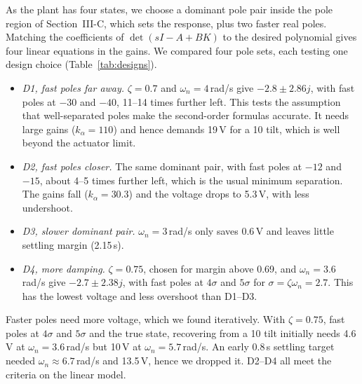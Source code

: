 As the plant has four states, we choose a dominant pole pair inside the pole region of Section~III-C, which sets the response, plus two faster real poles. Matching the coefficients of $\det(sI-A+BK)$ to the desired polynomial gives four linear equations in the gains. We compared four pole sets, each testing one design choice (Table~\ref{tab:designs}).
\begin{itemize}
\item \emph{D1, fast poles far away.} $\zeta=0.7$ and $\omega_n=4$\,rad/s give $-2.8\pm2.86j$, with fast poles at $-30$ and $-40$, 11--14 times further left. This tests the assumption that well-separated poles make the second-order formulas accurate. It needs large gains ($k_\alpha=110$) and hence demands 19\,V for a 10\textdegree{} tilt, which is well beyond the actuator limit.
\item \emph{D2, fast poles closer.} The same dominant pair, with fast poles at $-12$ and $-15$, about 4--5 times further left, which is the usual minimum separation. The gains fall ($k_\alpha=30.3$) and the voltage drops to 5.3\,V, with less undershoot.
\item \emph{D3, slower dominant pair.} $\omega_n=3$\,rad/s only saves 0.6\,V and leaves little settling margin (2.15\,s).
\item \emph{D4, more damping.} $\zeta=0.75$, chosen for margin above 0.69, and $\omega_n=3.6$\,rad/s give $-2.7\pm2.38j$, with fast poles at $4\sigma$ and $5\sigma$ for $\sigma=\zeta\omega_n=2.7$. This has the lowest voltage and less overshoot than D1--D3.
\end{itemize}
Faster poles need more voltage, which we found iteratively. With $\zeta=0.75$, fast poles at $4\sigma$ and $5\sigma$ and the true state, recovering from a 10\textdegree{} tilt initially needs 4.6\,V at $\omega_n=3.6$\,rad/s but 10\,V at $\omega_n=5.7$\,rad/s. An early 0.8\,s settling target needed $\omega_n\approx6.7$\,rad/s and 13.5\,V, hence we dropped it. D2--D4 all meet the criteria on the linear model.

